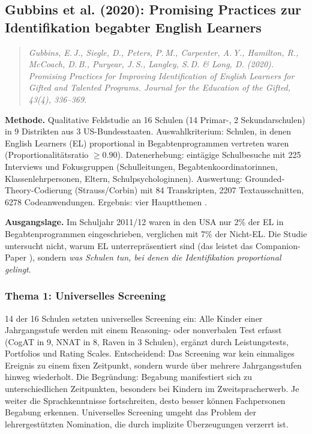 \documentclass[ngerman, a4paper]{article}
\begin{document}
\subsection*{Gubbins et al. (2020): Promising Practices zur Identifikation
  begabter English Learners}
\label{subsec:gubbins2020}

\begin{quote}\itshape
  Gubbins, E.\,J., Siegle, D., Peters, P.\,M., Carpenter, A.\,Y.,
  Hamilton, R., McCoach, D.\,B., Puryear, J.\,S., Langley, S.\,D.
  \& Long, D. (2020). Promising Practices
  for Improving Identification of English Learners for Gifted and Talented
  Programs. \upshape Journal for the Education of the Gifted, 43(4),
  336--369.
\end{quote}

\textbf{Methode.} Qualitative Feldstudie an 16 Schulen (14 Primar-, 2
Sekundarschulen) in 9 Distrikten aus 3 US-Bundesstaaten. Auswahlkriterium:
Schulen, in denen English Learners (EL) proportional in
Begabtenprogrammen vertreten waren (Proportionalitätsratio $\geq 0.90$).
Datenerhebung: eintägige Schulbesuche mit 225 Interviews und Fokusgruppen
(Schulleitungen, Begabtenkoordinatorinnen, Klassenlehrpersonen, Eltern,
Schulpsychologinnen). Auswertung: Grounded-Theory-Codierung
(Strauss/Corbin) mit 84 Transkripten, 2207 Textausschnitten, 6278
Codeanwendungen. Ergebnis: vier Hauptthemen
\parencite[S.\,9--13,\,23]{gubbins2020promising}.

\textbf{Ausgangslage.} Im Schuljahr 2011/12 waren in den USA nur 2\% der
EL in Begabtenprogrammen eingeschrieben, verglichen mit 7\% der Nicht-EL.
Die Studie untersucht nicht, warum EL unterrepräsentiert sind (das leistet
das Companion-Paper \textcite{mun2020identifying}), sondern
\textit{was Schulen tun, bei denen die Identifikation proportional
  gelingt}.

\subsubsection*{Thema 1: Universelles Screening}

14 der 16 Schulen setzten universelles Screening ein: Alle Kinder einer
Jahrgangsstufe werden mit einem Reasoning- oder nonverbalen Test erfasst
(CogAT in 9, NNAT in 8, Raven in 3 Schulen), ergänzt durch
Leistungstests, Portfolios und Rating Scales. Entscheidend: Das Screening
war kein einmaliges Ereignis zu einem fixen Zeitpunkt, sondern wurde über
mehrere Jahrgangsstufen hinweg wiederholt. Die Begründung: Begabung
manifestiert sich zu unterschiedlichen Zeitpunkten, besonders bei Kindern
im Zweitspracherwerb. Je weiter die Sprachkenntnisse fortschreiten, desto
besser können Fachpersonen Begabung erkennen. Universelles Screening
umgeht das Problem der lehrergestützten Nomination, die durch implizite
Überzeugungen verzerrt ist.
\end{document}
